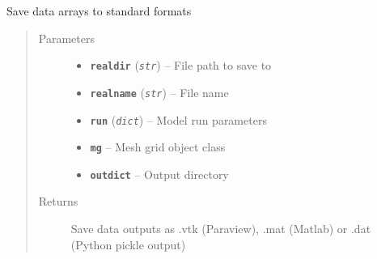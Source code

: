 \documentclass[letterpaper,10pt,english]{sphinxmanual}
\begin{document}
\begin{fulllineitems}
\label{hyvr:hyvr.hyvr.sim.save_outputs}
Save data arrays to standard formats
\begin{quote}\begin{description}
\item[{Parameters}] \leavevmode\begin{itemize}
\item {} 
\textbf{\texttt{realdir}} (\emph{\texttt{str}}) -- File path to save to

\item {} 
\textbf{\texttt{realname}} (\emph{\texttt{str}}) -- File name

\item {} 
\textbf{\texttt{run}} (\emph{\texttt{dict}}) -- Model run parameters

\item {} 
\textbf{\texttt{mg}} -- Mesh grid object class

\item {} 
\textbf{\texttt{outdict}} -- Output directory

\end{itemize}

\item[{Returns}] \leavevmode
Save data outputs as .vtk (Paraview), .mat (Matlab) or .dat (Python pickle output)

\end{description}\end{quote}

\end{fulllineitems}

\end{document}
